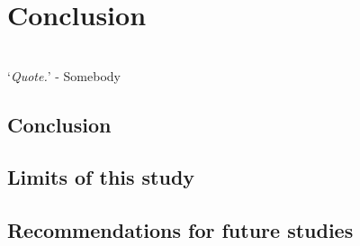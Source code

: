 \chapter{Conclusion}
\vspace{38em}

\hrulefill
\\
\enquote*{\textit{Quote.}} - Somebody\\
\newpage
	 \section{Conclusion}
	 \section{Limits of this study}
	 \section{Recommendations for future studies}